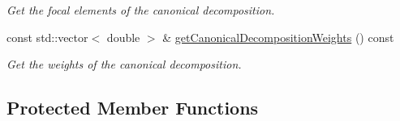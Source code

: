 \begin{DoxyCompactItemize}
\begin{DoxyCompactList}\small\item\em Get the focal elements of the canonical decomposition. \end{DoxyCompactList}\item 
const std\+::vector$<$ double $>$ \& \hyperlink{classEvidence_a712ef648ec40baa3c959079b44f2d99c}{get\+Canonical\+Decomposition\+Weights} () const 
\begin{DoxyCompactList}\small\item\em Get the weights of the canonical decomposition. \end{DoxyCompactList}\end{DoxyCompactItemize}
\subsection*{Protected Member Functions}
